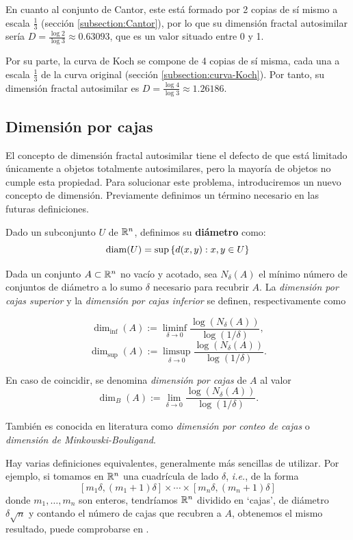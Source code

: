 En cuanto al conjunto de Cantor, este está formado por 2 copias de sí mismo a escala $\frac 1 3$ (sección \ref{subsection:Cantor}), por lo que su dimensión fractal autosimilar sería $D=\frac{\log 2}{\log 3} \approx 0.63093$, que es un valor situado entre 0 y 1.

Por su parte, la curva de Koch se compone de 4 copias de sí misma, cada una a escala $\frac 1 3$ de la curva original (sección \ref{subsection:curva-Koch}). Por tanto, su dimensión fractal autosimilar es $D=\frac{\log 4}{\log 3} \approx 1.26186$.

\subsection{Dimensión por cajas}
\label{subsection:dim-cajas}

El concepto de dimensión fractal autosimilar tiene el defecto de que está limitado únicamente a objetos totalmente autosimilares, pero la mayoría de objetos no cumple esta propiedad. Para solucionar este problema, introduciremos un nuevo concepto de dimensión. Previamente definimos un término necesario en las futuras definiciones.

\begin{definicion}
Dado un subconjunto $U$ de $\mathbb{R}^n$, definimos su \textbf{diámetro} como:
$$
\mathrm{diam}(U)=\sup \left\lbrace d(x,y): x,y\in U\right\rbrace 
$$
\end{definicion}

Dada un conjunto $A\subset \mathbb{R}^n$ no vacío y acotado, sea $N_\delta(A)$ el mínimo número de conjuntos de diámetro a lo sumo $\delta$ necesario para recubrir $A$. La \textit{dimensión por cajas superior} y la \textit{dimensión por cajas inferior} se definen, respectivamente como

$$
\dim_{\inf}(A) := \liminf_{\delta\rightarrow 0}\frac{\log(N_\delta(A))}{\log(1/\delta)},
$$
$$
\dim_{\sup}(A) := \limsup_{\delta\rightarrow 0}\frac{\log(N_\delta(A))}{\log(1/\delta)}.
$$

En caso de coincidir, se denomina \textit{dimensión por cajas} de $A$ al valor 
\begin{equation}
  \label{eq:dim-cajas}
  \dim_{B}(A) := \lim_{\delta\rightarrow 0}\frac{\log(N_\delta(A))}{\log(1/\delta)}.
\end{equation}

También es conocida en literatura como \textit{dimensión por conteo de cajas} o \textit{dimensión de Minkowski-Bouligand}.

Hay varias definiciones equivalentes, generalmente más sencillas de utilizar. Por ejemplo, si tomamos en $\mathbb{R}^n$ una cuadrícula de lado $\delta$, \textit{i.e.}, de la forma
$$
[m_1 \delta, (m_1+1)\delta]\times\cdots\times[m_n \delta, (m_n+1)\delta]
$$
donde $m_1,\dots,m_n$ son enteros, tendríamos $\mathbb{R}^n$ dividido en `cajas', de diámetro $\delta\sqrt{n}$ y contando el número de cajas que recubren a $A$, obtenemos el mismo resultado, puede comprobarse en \cite[sección 3.1]{alma991007022459704990}.

